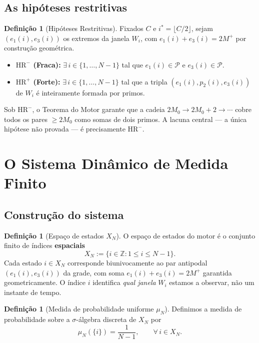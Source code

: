 \documentclass[12pt,a4paper]{article}
\theoremstyle{definition}
\newtheorem{definition}[theorem]{Definição}
\newcommand{\Z}{\mathbb{Z}}
\newcommand{\PP}{\mathcal{P}}          %
\newcommand{\HRm}{\mathrm{HR}^{-}}
\newcommand{\HRp}{\mathrm{HR}^{+}}
\begin{document}
	\subsection{As hipóteses restritivas}
	
	\begin{definition}[Hipóteses Restritivas]
		\label{def:HR}
		Fixados $C$ e $i^* = \lfloor C/2 \rfloor$, sejam $(e_1(i), e_3(i))$ os
		extremos da janela $W_i$, com $e_1(i)+e_3(i)=2M^+$ por construção
		geométrica.
		
		\begin{itemize}
			\item \textbf{$\HRm$ (Fraca):} $\exists\, i \in \{1,\ldots,N-1\}$
			tal que $e_1(i) \in \PP$ e $e_3(i) \in \PP$.
			\item \textbf{$\HRp$ (Forte):} $\exists\, i \in \{1,\ldots,N-1\}$
			tal que a tripla $(e_1(i), p_2(i), e_3(i))$ de $W_i$ é
			inteiramente formada por primos.
		\end{itemize}
	\end{definition}
	
	Sob $\HRm$, o Teorema do Motor \cite[Thm.~7.3]{motor} garante que a
	cadeia $2M_0 \to 2M_0 + 2 \to \cdots$ cobre todos os pares $\geq 2M_0$
	como somas de dois primos. A lacuna central — a única hipótese não provada
	— é precisamente $\HRm$.
	
	\section{O Sistema Dinâmico de Medida Finito}
	\label{sec:dinamica}
	
	\subsection{Construção do sistema}
	
	\begin{definition}[Espaço de estados $X_N$]
		\label{def:estados}
		O espaço de estados do motor é o conjunto finito de índices
		\textbf{espaciais}
		\[
		X_N := \{i \in \Z : 1 \leq i \leq N-1\}.
		\]
		Cada estado $i \in X_N$ corresponde biunivocamente ao par antipodal
		$(e_1(i), e_3(i))$ da grade, com soma $e_1(i)+e_3(i)=2M^+$
		garantida geometricamente.  O índice $i$ identifica
		\emph{qual janela} $W_i$ estamos a observar, não um instante de
		tempo.
	\end{definition}
	
	\begin{definition}[Medida de probabilidade uniforme $\mu_N$]
		Definimos a medida de probabilidade sobre a $\sigma$-álgebra discreta
		de $X_N$ por
		\[
		\mu_N(\{i\}) = \frac{1}{N-1},\qquad \forall\, i \in X_N.
		\]
	\end{definition}
	
\end{document}
